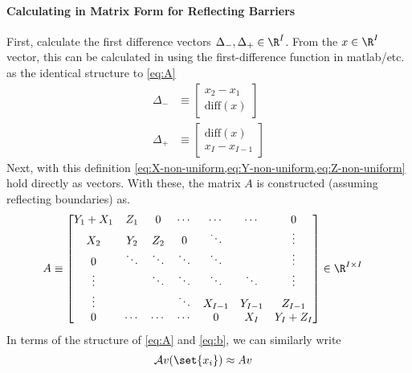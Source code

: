 \documentclass[11pt]{etk-article}
\begin{document}
\paragraph{Calculating in Matrix Form for Reflecting Barriers}
First, calculate the first difference vectors $\Delta_{-}, \Delta_{+} \in \R^I$.  From the $x \in \R^I$ vector, this can be calculated in using the first-difference function in matlab/etc. as the identical structure to \cref{eq:A}
\begin{align}
\Delta_{-} &\equiv \begin{bmatrix} x_2 - x_1 \\
\text{diff}(x)
\end{bmatrix}\\
\Delta_{+} &\equiv \begin{bmatrix} \text{diff}(x)\\
x_I - x_{I-1}
\end{bmatrix}
\end{align}
Next, with this definition \cref{eq:X-non-uniform,eq:Y-non-uniform,eq:Z-non-uniform} hold directly as vectors.  With these, the matrix $A$ is constructed (assuming reflecting boundaries) as.
\begin{align}
A &\equiv \begin{bmatrix}
Y_1 + X_1 & Z_1 & 0 & \cdots & \cdots & \cdots & 0 \\
X_2 & Y_2 & Z_2 & 0 & \ddots& & \vdots \\
0 & \ddots & \ddots & \ddots & \ddots &  & \vdots \\
\vdots & &\ddots & \ddots & \ddots & \ddots  & \vdots \\
\vdots & & & \ddots & X_{I-1} & Y_{I-1}  & Z_{I-1} \\
0 & \cdots & \cdots & \cdots & 0 & X_I & Y_I+Z_I\\
\end{bmatrix}\in\R^{I\times I}\label{eq:A-non-uniform}
\end{align}
In terms of the structure of \ref{eq:A} and \ref{eq:b}, we can similarly write
\begin{align}
\mathcal{A}v(\set{x_i}) &\approx  A v
\end{align}
\end{document}
